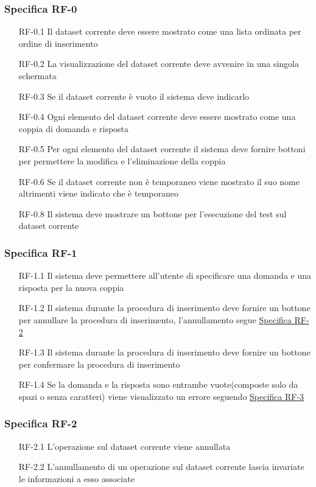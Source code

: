 \subsubsection{Specifica RF-0}
\label{subsubsec:RF-0}
\begin{enumerate}
    \item[RF-0.1] Il dataset corrente deve essere mostrato come una lista ordinata per ordine di inserimento
    \item[RF-0.2] La visualizzazione del dataset corrente deve avvenire in una singola schermata
    \item[RF-0.3] Se il dataset corrente è vuoto il sistema deve indicarlo
    \item[RF-0.4] Ogni elemento del dataset corrente deve essere mostrato come una coppia di domanda e risposta 
    \item[RF-0.5] Per ogni elemento del dataset corrente il sistema deve fornire bottoni per permettere la modifica e l'eliminazione della coppia
    \item[RF-0.6] Se il dataset corrente non è temporaneo viene mostrato il suo nome altrimenti viene indicato che è temporaneo
    \item[RF-0.8] Il sistema deve mostrare un bottone per l'esecuzione del test sul dataset corrente
\end{enumerate}

\subsubsection{Specifica RF-1}
\label{subsubsec:RF-1}
\begin{enumerate}
    \item[RF-1.1] Il sistema deve permettere all'utente di specificare una domanda e una risposta per la nuova coppia
    \item[RF-1.2] Il sistema durante la procedura di inserimento deve fornire un bottone per annullare la procedura di inserimento, l'annullamento segue \hyperref[subsubsec:RF-2]{Specifica RF-2}
    \item[RF-1.3] Il sistema durante la procedura di inserimento deve fornire un bottone per confermare la procedura di inserimento
    \item[RF-1.4] Se la domanda e la risposta sono entrambe vuote(composte solo da spazi o senza caratteri) viene visualizzato un errore seguendo \hyperref[subsubsec:RF-3]{Specifica RF-3}
\end{enumerate}

\subsubsection{Specifica RF-2}
\label{subsubsec:RF-2}
\begin{enumerate}
    \item[RF-2.1] L'operazione sul dataset corrente viene annullata
    \item[RF-2.2] L'annullamento di un operazione sul dataset corrente lascia invariate le informazioni a esso associate 
\end{enumerate}


